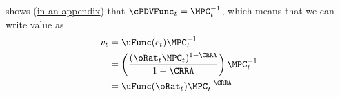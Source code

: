 \cite{BufferStockTheory} shows (\href{http://www.econ2.jhu.edu/people/ccarroll/papers/BufferStockTheory/#MPCnvrsIsCPDV}{in an appendix}) that $\cPDVFunc_{t} = \MPC_{t}^{-1}$, which means that we can write value as
\begin{equation}\begin{gathered}\begin{aligned}
  v_{t} & =  \uFunc(c_{t})\MPC^{-1}_{t}
  \\ & =  \left(\frac{(\oRat_{t}\MPC_{t})^{1-\CRRA}}{1-\CRRA}\right)\MPC_{t}^{-1}
\\ & =  \uFunc(\oRat_{t})\MPC_{t}^{-\CRRA}
\end{aligned}\end{gathered}\end{equation}

